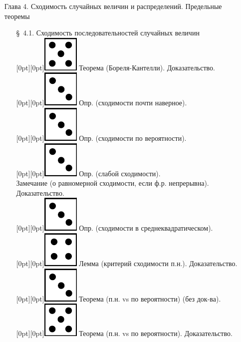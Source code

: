 \documentclass[10pt]{amsart}
\begin{document}
\begin{enumerate}
    
\item[Глава 4.] Сходимость случайных величин и распределений. Предельные теоремы \\
\begin{enumerate}
\item[\S\, 4.1.] Сходимость последовательностей случайных величин \\
 \raisebox{-1pt}[0pt][0pt]{\includegraphics[width=0.02\linewidth]{5.png}} Теорема (Бореля-Кантелли). Доказательство. \\
 \raisebox{-1pt}[0pt][0pt]{\includegraphics[width=0.02\linewidth]{3.png}} Опр. (сходимости почти наверное). \\
 \raisebox{-1pt}[0pt][0pt]{\includegraphics[width=0.02\linewidth]{3.png}} Опр. (сходимости по вероятности). \\
 \raisebox{-1pt}[0pt][0pt]{\includegraphics[width=0.02\linewidth]{3.png}} Опр. (слабой сходимости). \\
Замечание (о равномерной сходимости, если ф.р. непрерывна). Доказательство. \\
 \raisebox{-1pt}[0pt][0pt]{\includegraphics[width=0.02\linewidth]{3.png}} Опр. (сходимости в среднеквадратическом). \\
 \raisebox{-1pt}[0pt][0pt]{\includegraphics[width=0.02\linewidth]{4.png}} Лемма (критерий сходимости п.н.). Доказательство. \\
 \raisebox{-1pt}[0pt][0pt]{\includegraphics[width=0.02\linewidth]{3.png}} Теорема (п.н. vs по вероятности)  (без док-ва). \\
 \raisebox{-1pt}[0pt][0pt]{\includegraphics[width=0.02\linewidth]{5.png}} Теорема (п.н. vs по вероятности). Доказательство. \\

\end{enumerate}
\end{enumerate}
\end{document}
